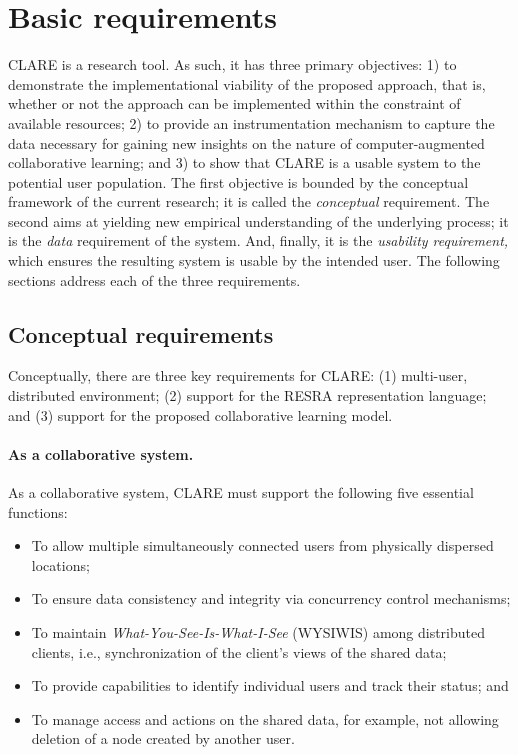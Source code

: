 \section{Basic requirements}
\label{sec:requirements}

CLARE is a research tool. As such, it has three primary objectives: 1) to
demonstrate the implementational viability of the proposed approach, that
is, whether or not the approach can be implemented within the constraint of
available resources; 2) to provide an instrumentation mechanism to capture
the data necessary for gaining new insights on the nature of
computer-augmented collaborative learning; and 3) to show that CLARE is a
usable system to the potential user population. The first objective is
bounded by the conceptual framework of the current research; it is called
the {\it conceptual\/} requirement. The second aims at yielding new
empirical understanding of the underlying process; it is the {\it data}
requirement of the system. And, finally, it is the {\it usability
requirement,\/} which ensures the resulting system is usable by the
intended user. The following sections address each of the three
requirements.


\subsection{Conceptual requirements}
\label{sec:conceptual-requirement}

Conceptually, there are three key requirements for CLARE: (1) multi-user,
distributed environment; (2) support for the RESRA representation language;
and (3) support for the proposed collaborative learning model.

\paragraph{As a collaborative system.}

As a collaborative system, CLARE must support the following five essential
functions:

\begin{itemize}
\item To allow multiple simultaneously connected users from physically
  dispersed locations;
  
\item To ensure data consistency and integrity via concurrency control
  mechanisms;
  
\item To maintain {\it What-You-See-Is-What-I-See\/} (WYSIWIS) among
  distributed clients, i.e., synchronization of the client's views of the
  shared data;
  
\item To provide capabilities to identify individual users and track
  their status; and
  
\item To manage access and actions on the shared data, for example, not
  allowing deletion of a node created by another user.
\end{itemize}

